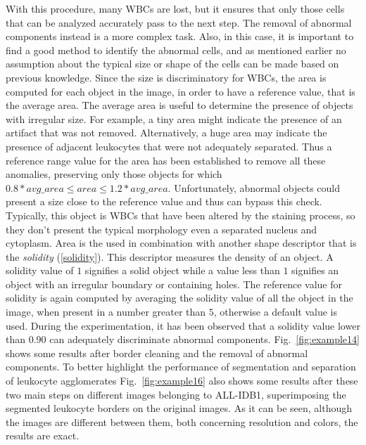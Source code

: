 {	With this procedure, many WBCs are lost, but it ensures that only those cells that can be analyzed accurately pass to the next step. The removal of abnormal components instead is a more complex task. Also, in this case, it is important to find a good method to identify the abnormal cells, and as mentioned earlier no assumption about the typical size or shape of the cells can be made based on previous knowledge. Since the size is discriminatory for WBCs, the area is computed for each object in the image, in order to have a reference value, that is the average area. The average area is useful to determine the presence of objects with irregular size. For example, a tiny area might indicate the presence of an artifact that was not removed. Alternatively, a huge area may indicate the presence of adjacent leukocytes that were not adequately separated. Thus a reference range value for the area has been established to remove all these anomalies, preserving only those objects for which $0.8*avg\_area \leq area \leq 1.2*avg\_area$. Unfortunately, abnormal objects could present a size close to the reference value and thus can bypass this check. Typically, this object is WBCs that have been altered by the staining process, so they don't present the typical morphology even a separated nucleus and cytoplasm. Area is the used in combination with another shape descriptor that is the \textit{solidity} (\ref{solidity}). This descriptor measures the density of an object.
	A solidity value of $1$ signifies a solid object while a value less than $1$ signifies an object with an irregular boundary or containing holes. The reference value for solidity is again computed by averaging the solidity value of all the object in the image, when present in a number greater than $5$, otherwise a default value is used. During the experimentation, it has been observed that a solidity value lower than $0.90$ can adequately discriminate abnormal components. Fig.~\ref{fig:example14}  shows some results after border cleaning and the removal of abnormal components. To better highlight the performance of segmentation and separation of leukocyte agglomerates Fig.~\ref{fig:example16} also shows some results after these two main steps on different images belonging to ALL-IDB1, superimposing the segmented leukocyte borders on the original images. As it can be seen, although the images are different between them, both concerning resolution and colors, the results are exact.
	
}
